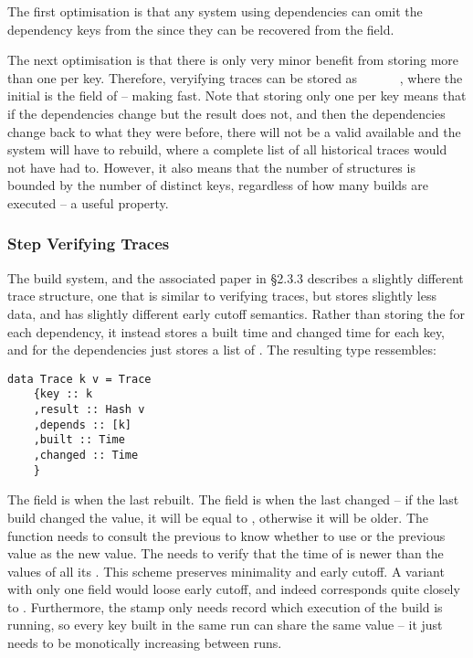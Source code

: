 The first optimisation is that any system using  dependencies can omit the dependency
keys from the  since they can be recovered from the  field.

The next optimisation is that there is only very minor benefit from storing more than one  per key. Therefore, veryifying traces can be stored as ~~~~~~, where the
initial  is the  field of  -- making  fast.
Note that storing only one  per key means that if the dependencies change but the result does not, and then the
dependencies change back to what they were before, there will not be a valid  available and the system will have to rebuild, where a complete list of all historical traces would not have had to. However, it also means that the number of  structures is bounded by the number of distinct keys, regardless of how many builds are executed -- a useful property.

\subsubsection{Step Verifying Traces}

The \Shake build system, and the associated paper \cite{mitchell2012shake} in \S2.3.3 describes a slightly different trace structure, one that is similar to verifying traces, but stores slightly less data, and has slightly different early cutoff semantics. Rather than storing the  for each dependency, it instead stores a built time and changed time for each key, and for the dependencies just stores a list of . The resulting  type ressembles:

\begin{verbatim}
data Trace k v = Trace
    {key :: k
    ,result :: Hash v
    ,depends :: [k]
    ,built :: Time
    ,changed :: Time
    }
\end{verbatim}

The  field is when the  last rebuilt. The  field is when the  last changed -- if the last build changed the value, it will be equal to , otherwise it will be older. The  function needs to consult the previous  to know whether to use  or the previous  value as the new  value. The  needs to verify that the  time of  is newer than the  values of all its . This scheme preserves minimality and early cutoff. A variant with only one  field would loose early cutoff, and indeed corresponds quite closely to \Make. Furthermore, the  stamp only needs record which execution of the build is running, so every key built in the same run can share the same  value -- it just needs to be monotically increasing between runs.


